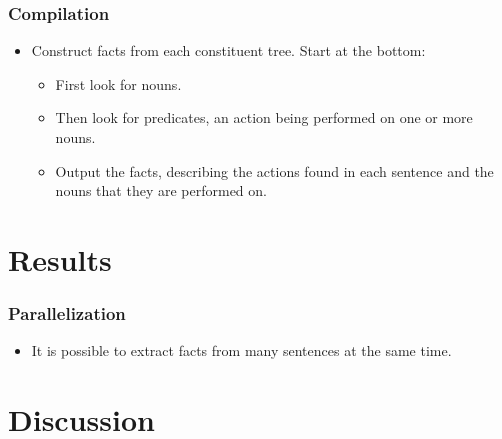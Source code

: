 \documentclass[mathserif]{beamer}
\begin{document}
  \begin{frame}

    \frametitle{Compilation}

    \begin{itemize}[<+->]

      \item Construct facts from each constituent tree. Start at the bottom:
      \begin{itemize}[<+->]

        \item First look for nouns.
        \item Then look for predicates, an action being performed on
        one or more nouns.
        \item Output the facts, describing the actions found in each
        sentence and the nouns that they are performed on.

      \end{itemize}

    \end{itemize}

  \end{frame}

  \section{Results}

  \begin{frame}

    \frametitle{Parallelization}

    \begin{itemize}[<+->]

      \item It is possible to extract facts from many sentences at the same time.

    \end{itemize}

  \end{frame}

  \section{Discussion}
\end{document}
